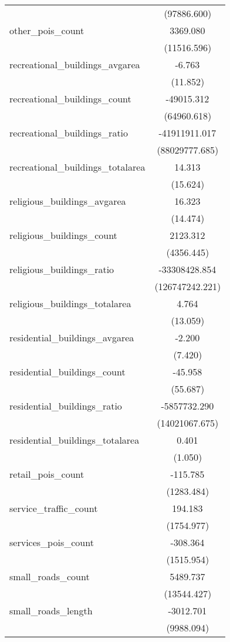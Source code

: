 \begin{table}[!htbp]
\begin{tabular}{@{\extracolsep{5pt}}lc}
  & (97886.600) \\
 other_pois_count & 3369.080$^{}$ \\
  & (11516.596) \\
 recreational_buildings_avgarea & -6.763$^{}$ \\
  & (11.852) \\
 recreational_buildings_count & -49015.312$^{}$ \\
  & (64960.618) \\
 recreational_buildings_ratio & -41911911.017$^{}$ \\
  & (88029777.685) \\
 recreational_buildings_totalarea & 14.313$^{}$ \\
  & (15.624) \\
 religious_buildings_avgarea & 16.323$^{}$ \\
  & (14.474) \\
 religious_buildings_count & 2123.312$^{}$ \\
  & (4356.445) \\
 religious_buildings_ratio & -33308428.854$^{}$ \\
  & (126747242.221) \\
 religious_buildings_totalarea & 4.764$^{}$ \\
  & (13.059) \\
 residential_buildings_avgarea & -2.200$^{}$ \\
  & (7.420) \\
 residential_buildings_count & -45.958$^{}$ \\
  & (55.687) \\
 residential_buildings_ratio & -5857732.290$^{}$ \\
  & (14021067.675) \\
 residential_buildings_totalarea & 0.401$^{}$ \\
  & (1.050) \\
 retail_pois_count & -115.785$^{}$ \\
  & (1283.484) \\
 service_traffic_count & 194.183$^{}$ \\
  & (1754.977) \\
 services_pois_count & -308.364$^{}$ \\
  & (1515.954) \\
 small_roads_count & 5489.737$^{}$ \\
  & (13544.427) \\
 small_roads_length & -3012.701$^{}$ \\
  & (9988.094) \\

\end{tabular}
\end{table}
